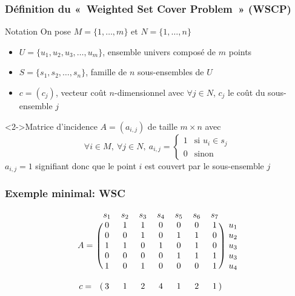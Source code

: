 \documentclass[aspectratio=169,11pt]{beamer}
\begin{document}
	\begin{frame}
		\frametitle{Définition du « Weighted Set Cover Problem » (WSCP)}
		\begin{block}{Notation}
			On pose \(M = \{1,\ldots,m\}\) et \(N = \{1,\ldots,n\}\)
			\begin{itemize}
				\item \(U = \{u_1, u_2, u_3, \dots, u_m\}\), ensemble univers composé de \(m\) points
				\item \(S = \{s_1, s_2, \dots, s_n\}\), famille de \(n\) sous-ensembles de \(U\)
				\item \(c = \left(c_j\right)\), vecteur coût \(n\)-dimensionnel avec \(\forall j \in N\), \(c_j\) le coût du sous-ensemble \(j\)
			\end{itemize}
		\end{block}
		\begin{block}<2->{Matrice d'incidence}
			\(A = \left(a_{i,j}\right)\) de taille \(m \times n\) avec
			\[\forall i \in M,\ \forall j \in N,\ a_{i,j} = \left\{
				\begin{array}{ll}
					1 & \text{si } u_i \in s_j \\
					0 & \text{sinon}
				\end{array}
			\right.\]
			\(a_{i,j} = 1\) signifiant donc que le point \(i\) est couvert par le sous-ensemble \(j\)
		\end{block}
	\end{frame}
	\begin{frame}
		\frametitle{Exemple minimal: WSC}
		\[
		\begin{blockarray}{ccccccccc}
			& s_1 & s_2 & s_3 & s_4 & s_5 & s_6 & s_7 \\
			\begin{block}{c(ccccccc)c}
				   & 0 & 1 & 1 & 0 & 0 & 0 & 1 & u_1\\
				   & 0 & 0 & 1 & 0 & 1 & 1 & 0 & u_2\\
				A= & 1 & 1 & 0 & 1 & 0 & 1 & 0 & u_3\\
				   & 0 & 0 & 0 & 0 & 1 & 1 & 1 & u_3\\
				   & 1 & 0 & 1 & 0 & 0 & 0 & 1 & u_4\\
			\end{block}
			\\
			\begin{block}{c(ccccccc)c}
				c = & 3 & 1 & 2 & 4 & 1 & 2 & 1 &\\
			\end{block}
		\end{blockarray}
		\]
	\end{frame}
\end{document}
